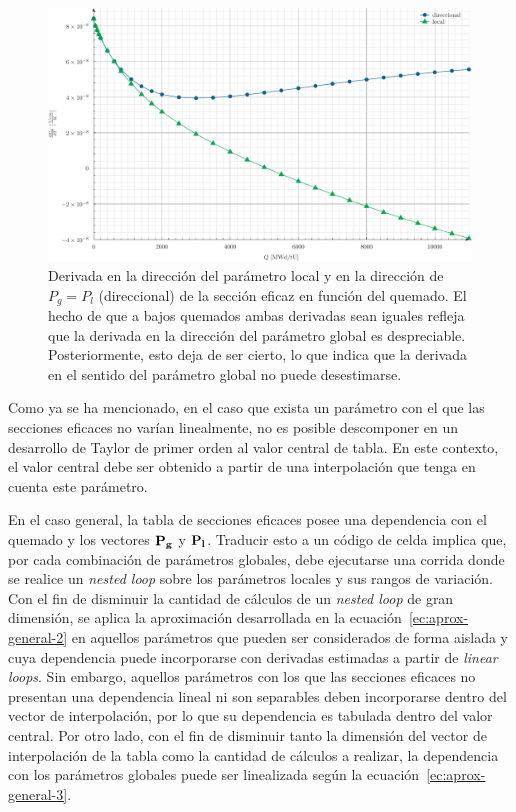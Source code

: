 \documentclass[11pt]{article}
\renewcommand{\vec}[1]{\ensuremath\mathbf{#1}}
\begin{document}
\begin{figure}[!h]
 \begin{center}
  \includegraphics[width=0.75\linewidth]{graficos/dependencias-xs/dxs.pdf}
 \end{center}
\caption{\label{fig:global-local-pth-3} Derivada en la dirección del parámetro local y en la dirección de $P_g = P_l$ (direccional) de la sección eficaz en función del quemado. El hecho de que a bajos quemados ambas derivadas sean iguales refleja que la derivada en la dirección del parámetro global es despreciable. Posteriormente, esto deja de ser cierto, lo que indica que la derivada en el sentido del parámetro global no puede desestimarse.}
\end{figure}

Como ya se ha mencionado, en el caso que exista un parámetro con el que las secciones eficaces no varían linealmente, no es posible descomponer en un desarrollo de Taylor de primer orden al valor central de tabla. En este contexto, el valor central debe ser obtenido a partir de una interpolación que tenga en cuenta este parámetro. 

En el caso general, la tabla de secciones eficaces posee una dependencia con el quemado y los vectores $\vec{P_g}$ y $\vec{P_l}$. Traducir esto a un código de celda implica que, por cada combinación de parámetros globales, debe ejecutarse una corrida donde se realice un \emph{nested loop} sobre los parámetros locales y sus rangos de variación. Con el fin de disminuir la cantidad de cálculos de un \emph{nested loop} de gran dimensión, se aplica la aproximación desarrollada en la ecuación~\ref{ec:aprox-general-2} en aquellos parámetros que pueden ser considerados de forma aislada y cuya dependencia puede incorporarse con derivadas estimadas a partir de \emph{linear loops}. Sin embargo, aquellos parámetros con los que las secciones eficaces no presentan una dependencia lineal ni son separables deben incorporarse dentro del vector de interpolación, por lo que su dependencia es tabulada dentro del valor central. Por otro lado, con el fin de disminuir tanto la dimensión del vector de interpolación de la tabla como la cantidad de cálculos a realizar, la dependencia con los parámetros globales puede ser linealizada según la ecuación~\ref{ec:aprox-general-3}.
\end{document}
